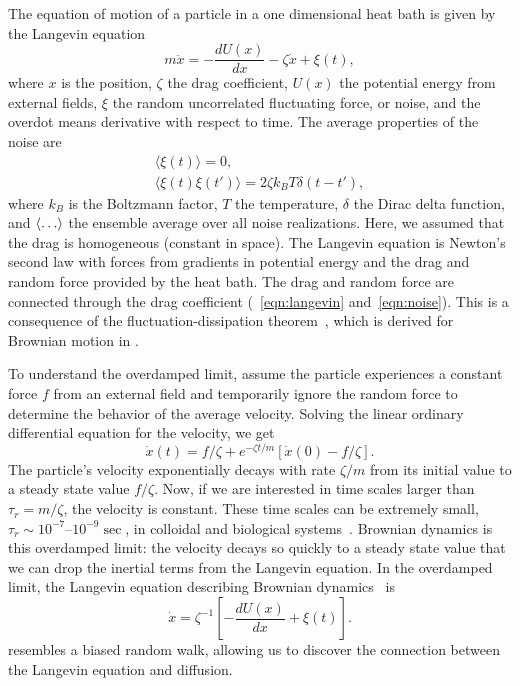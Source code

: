 The equation of motion of a particle in a one dimensional heat bath is given by
the Langevin equation~\cite{zwanzig_nonequilibrium_01} 
%
\begin{equation}
  \label{eqn:langevin}
   m \ddot{x} = -\frac{d U(x)}{dx} -\zeta \dot{x} + \xi(t),
\end{equation}
%
where $x$ is the position, $\zeta$ the drag coefficient, $U(x)$ the potential
energy from external fields, $\xi$ the random uncorrelated fluctuating force,
or noise, and the overdot means derivative with respect to time. The  average
properties of the noise are
\begin{gather}
  \langle \xi( t ) \rangle = 0, \\
  \label{eqn:noise}
  \langle \xi( t ) \xi( t') \rangle 
  = 2 \zeta k_B T \delta(t-t'),
\end{gather}
%
where $k_B$ is the Boltzmann factor, $T$ the temperature, $\delta$ the Dirac
delta function, and $\left\langle \ldots \right\rangle$ the ensemble average over all noise
realizations.  Here, we assumed that the drag is homogeneous (constant in
space).  The Langevin equation is Newton's second law with
forces from gradients in potential energy and the drag
and random force provided by the heat bath.  The drag and random force are
connected through the drag coefficient (\eqn~\ref{eqn:langevin}
and~\ref{eqn:noise}).  This is a consequence of the fluctuation-dissipation
theorem~\cite{zwanzig_nonequilibrium_01}, which is derived for Brownian motion in
.

To understand the overdamped limit, assume the particle experiences a constant
force $f$ from an external field and temporarily ignore the random force to
determine the behavior of the average velocity.  Solving the linear
ordinary differential equation for the velocity, we get
%
\begin{equation}
  \dot{x}(t) = f / \zeta + e^{-\zeta t/m} 
    \left[ \dot{x}(0) - f / \zeta \right].
\end{equation}
%
The particle's velocity exponentially decays with rate $\zeta /m $ from its
initial value to a steady state value $ f / \zeta $.  Now, if we are interested
in time scales larger than $ \tau_r = m / \zeta $, the velocity is constant.
These time scales can be extremely small, $ \tau_r \sim 10^{-7}$--$10^{-9}
\sec$, in colloidal and biological systems~\cite{dhont_introduction_96,
  berg_random_93}.  Brownian dynamics is this overdamped limit: the velocity
decays so quickly to a steady state value that we can drop the inertial terms
from the Langevin equation.  In the overdamped limit, the Langevin equation
describing Brownian dynamics~\cite{doi_theory_88, zwanzig_nonequilibrium_01} is
%
\begin{equation}
  \label{eqn:brownian_1d}
  \dot{x} = \zeta ^{-1} \left[  -\frac{d U (x)}{dx } + \xi(t) \right].
\end{equation}
%
 resembles a biased random walk, allowing us to discover
the connection between the Langevin equation and diffusion.

